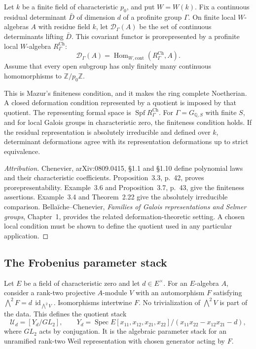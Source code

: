 \begin{proposition}
\label{v4-arith:ic:w5-h:prop:chenevier-moduli-via-det-trace}

Let $k$ be a finite field of characteristic $p_0$, and put $W=W(k)$.
Fix a continuous residual determinant $\bar D$ of dimension $d$
of a profinite group $\Gamma$. On finite local $W$-algebras $A$
with residue field $k$, let $\mathcal D_\Gamma(A)$ be the set of
continuous determinants lifting $\bar D$. This covariant functor
is prorepresented by a profinite local $W$-algebra $R_\Gamma^{\mathrm{Ch}}$:
\[
 \mathcal D_\Gamma(A)=
 \operatorname{Hom}_{W,\mathrm{cont}}(R_\Gamma^{\mathrm{Ch}},A).
\]
Assume that every open subgroup has only finitely many continuous
homomorphisms to $\mathbb Z/p_0\mathbb Z$.

This is Mazur's finiteness condition, and it makes the ring complete
Noetherian. A closed deformation condition
represented by a quotient is imposed by that quotient.
The representing formal space is $\operatorname{Spf}R_\Gamma^{\mathrm{Ch}}$.
For $\Gamma=G_{\mathbb Q,S}$ with finite $S$, and for local Galois
groups in characteristic zero, the finiteness condition holds.
If the residual representation is absolutely irreducible and defined
over $k$, determinant deformations agree with its representation
deformations up to strict equivalence.
\end{proposition}

\begin{proof}[Attribution]
Chenevier, arXiv:0809.0415, \S1.1 and \S1.10 define polynomial
laws and their characteristic coefficients. Proposition~3.3,
p.~42, proves prorepresentability. Example~3.6 and
Proposition~3.7, p.~43, give the finiteness assertions.
Example~3.4 and Theorem~2.22 give the absolutely irreducible
comparison. Bella\"iche--Chenevier, \emph{Families of Galois
representations and Selmer groups}, Chapter~1, provides the related
deformation-theoretic setting. A chosen local condition must be
shown to define the quotient used in any particular application.
\end{proof}

\subsection{The Frobenius parameter stack}

Let $E$ be a field of characteristic zero and let $d\in E^\times$.
For an $E$-algebra $A$, consider a rank-two projective $A$-module $V$
with an automorphism $F$ satisfying
$\bigwedge^2F=d\,\operatorname{id}_{\bigwedge^2V}$.
Isomorphisms intertwine $F$. No trivialization of $\bigwedge^2V$ is
part of the data. This defines the quotient stack
\[
 \mathcal U_d=[Y_d/GL_2],\qquad
 Y_d=\operatorname{Spec}
 E[x_{11},x_{12},x_{21},x_{22}]/(x_{11}x_{22}-x_{12}x_{21}-d),
\]
where $GL_2$ acts by conjugation. It is the algebraic parameter stack
for an unramified rank-two Weil representation with chosen generator
acting by $F$.


